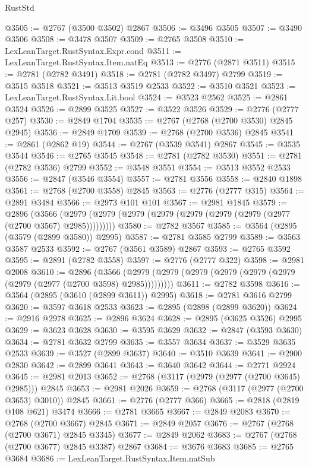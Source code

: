 \begin{lexlean}{RustStd}
\begin{coremodule}
@3505 := @2767 (@3500 @3502) @2867
@3506 := @3496 @3505
@3507 := @3490 @3506
@3508 := @3478 @3507
@3509 := @2765 @3508
@3510 := LexLeanTarget.RustSyntax.Expr.cond
@3511 := LexLeanTarget.RustSyntax.Item.natEq
@3513 := @2776 (@2871 @3511)
@3515 := @2781 (@2782 @3491)
@3518 := @2781 (@2782 @3497) @2799
@3519 := @3515 @3518
@3521 := @3513 @3519 @2533
@3522 := @3510 @3521
@3523 := LexLeanTarget.RustSyntax.Lit.bool
@3524 := @3523 @2562
@3525 := @2861 @3524
@3526 := @2899 @3525
@3527 := @3522 @3526
@3529 := @2776 (@2777 @257)
@3530 := @2849 @1704
@3535 := @2767 (@2768 (@2700 @3530) @2845 @2945)
@3536 := @2849 @1709
@3539 := @2768 (@2700 @3536) @2845
@3541 := @2861 (@2862 @19)
@3544 := @2767 (@3539 @3541) @2867
@3545 := @3535 @3544
@3546 := @2765 @3545
@3548 := @2781 (@2782 @3530)
@3551 := @2781 (@2782 @3536) @2799
@3552 := @3548 @3551
@3554 := @3513 @3552 @2533
@3556 := @2847 (@3546 @3554)
@3557 := @2781 @3556
@3558 := @2840 @1898
@3561 := @2768 (@2700 @3558) @2845
@3563 := @2776 (@2777 @315)
@3564 := @2891 @3484
@3566 := @2973 @101 @101
@3567 := @2981 @1845
@3579 := @2896
    (@3566 (@2979 (@2979 (@2979 (@2979 (@2979 (@2979 (@2979 (@2977 (@2700 @3567) @2985)))))))))
@3580 := @2782 @3567
@3585 := @3564 (@2895 (@3579 (@2899 @3580)) @2995)
@3587 := @2781 @3585 @2799
@3589 := @3563 @3587 @2533
@3592 := @2767 (@3561 @3589) @2867
@3593 := @2765 @3592
@3595 := @2891 (@2782 @3558)
@3597 := @2776 (@2777 @322)
@3598 := @2981 @2008
@3610 := @2896
    (@3566 (@2979 (@2979 (@2979 (@2979 (@2979 (@2979 (@2979 (@2977 (@2700 @3598) @2985)))))))))
@3611 := @2782 @3598
@3616 := @3564 (@2895 (@3610 (@2899 @3611)) @2995)
@3618 := @2781 @3616 @2799
@3620 := @3597 @3618 @2533
@3623 := @2895 (@2898 (@2899 @3620))
@3624 := @2916 @2978
@3625 := @2896 @3624
@3628 := @2895 (@3625 @3526) @2995
@3629 := @3623 @3628
@3630 := @3595 @3629
@3632 := @2847 (@3593 @3630)
@3634 := @2781 @3632 @2799
@3635 := @3557 @3634
@3637 := @3529 @3635 @2533
@3639 := @3527 (@2899 @3637)
@3640 := @3510 @3639
@3641 := @2900 @2830
@3642 := @2899 @3641
@3643 := @3640 @3642
@3644 := @2771 @2924
@3645 := @2981 @2013
@3652 := @2768 (@3117 (@2979 (@2977 (@2700 @3645) @2985))) @2845
@3653 := @2981 @2026
@3659 := @2768 (@3117 (@2977 (@2700 @3653) @3010)) @2845
@3661 := @2776 (@2777 @366)
@3665 := @2818 (@2819 @108 @621) @3474
@3666 := @2781 @3665
@3667 := @2849 @2083
@3670 := @2768 (@2700 @3667) @2845
@3671 := @2849 @2057
@3676 := @2767 (@2768 (@2700 @3671) @2845 @3345)
@3677 := @2849 @2062
@3683 := @2767 (@2768 (@2700 @3677) @2845 @3387) @2867
@3684 := @3676 @3683
@3685 := @2765 @3684
@3686 := LexLeanTarget.RustSyntax.Item.natSub

\end{coremodule}
\end{lexlean}
